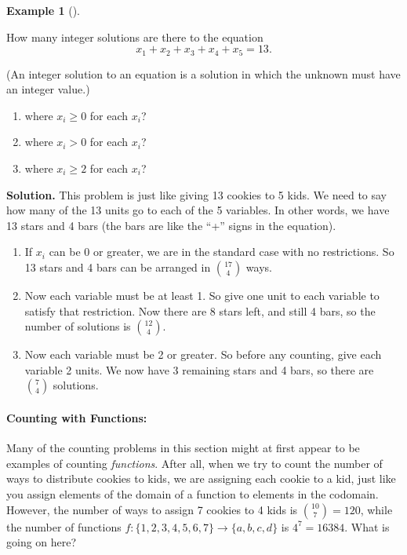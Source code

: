\documentclass[10pt,]{book}
\theoremstyle{plain}
\theoremstyle{definition}
\newtheorem{example}[theorem]{Example}
\theoremstyle{definition}
\theoremstyle{definition}
\numberwithin{equation}{section}
\begin{document}
\begin{example}[]\label{ex_stars-bars-int-sol}

How many integer solutions are there to the equation
\begin{equation*}
  x_1 + x_2 + x_3 + x_4 + x_5 = 13.
\end{equation*}
%
\par

(An integer solution to an equation is a solution in which the unknown must have an integer value.)
%
\leavevmode%
\begin{enumerate}
\item\hypertarget{li-566}{}
where \(x_i \ge 0\) for each \(x_i\)?
%
\item\hypertarget{li-567}{}
where \(x_i > 0\) for each \(x_i\)?
%
\item\hypertarget{li-568}{}
where \(x_i \ge 2\) for each \(x_i\)?
%
\end{enumerate}
\par\medskip\noindent%
\textbf{Solution.}\quad 
This problem is just like giving 13 cookies to 5 kids. We need to say how many of the 13 units go to each of the 5 variables. In other words, we have 13 stars and 4 bars (the bars are like the ``+'' signs in the equation).
%
\leavevmode%
\begin{enumerate}
\item\hypertarget{li-569}{}
If \(x_i\) can be 0 or greater, we are in the standard case with no restrictions.  So 13 stars and 4 bars can be arranged in \({17 \choose 4}\) ways.
%
\item\hypertarget{li-570}{}
Now each variable must be at least 1.  So give one unit to each variable to satisfy that restriction.  Now there are 8 stars left, and still 4 bars, so the number of solutions is \({12 \choose 4}\).
%
\item\hypertarget{li-571}{}
Now each variable must be 2 or greater.  So before any counting, give each variable 2 units.  We now have 3 remaining stars and 4 bars, so there are \({7 \choose 4}\) solutions.
%
\end{enumerate}
\end{example}
\typeout{************************************************}
\typeout{************************************************}
\paragraph[Counting with Functions:]{Counting with Functions:}\hypertarget{paragraphs-6}{}
 Many of the counting problems in this section might at first appear to be examples of counting \emph{functions}.  After all, when we try to count the number of ways to distribute cookies to kids, we are assigning each cookie to a kid, just like you assign elements of the domain of a function to elements in the codomain.  However, the number of ways to assign 7 cookies to 4 kids is \({10 \choose 7} = 120\), while the number of functions \(f: \{1,2,3,4,5,6,7\} \to \{a,b,c,d\}\) is \(4^7 = 16384\).  What is going on here? %
\par
\end{document}
